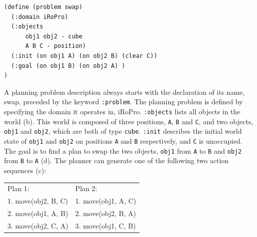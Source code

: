 \begin{verbatim}
(define (problem swap)
  (:domain iRoPro)
  (:objects 
      obj1 obj2 - cube
      A B C - position)
  (:init (on obj1 A) (on obj2 B) (clear C))
  (:goal (on obj1 B) (on obj2 A) )
)
\end{verbatim}

A planning problem description always starts with the declaration of its name, \eg swap, preceded by the keyword \texttt{:problem}.
The planning problem is defined by specifying the domain it operates in, \eg iRoPro.
\texttt{:objects} lists all objects in the world (b). 
This world is composed of three positions, \texttt{A}, \texttt{B} and \texttt{C}, and two objects, \texttt{obj1} and \texttt{obj2}, which are both of type \texttt{cube}. 
\texttt{:init} describes the initial world state of \texttt{obj1} and \texttt{obj2} on positions \texttt{A} and \texttt{B} respectively, and \texttt{C} is unoccupied.
The goal is to find a plan to swap the two objects, \ie \texttt{obj1} from \texttt{A} to \texttt{B} and \texttt{obj2} from \texttt{B} to \texttt{A} (d). 
The planner can generate one of the following two action sequences (c):

\begin{table}[h]
	\label{tab:swapsolutions}
	\begin{center}
		\begin{tabular}{l|l} 
			Plan 1: & Plan 2:\\ 
			1. move(obj2, B, C) &
			1. move(obj1, A, C)\\
			2. move(obj1, A, B)&
			2. move(obj2, B, A)\\
			3. move(obj2, C, A)&
			3. move(obj1, C, B)\\
		\end{tabular}
	\end{center}
\end{table}

